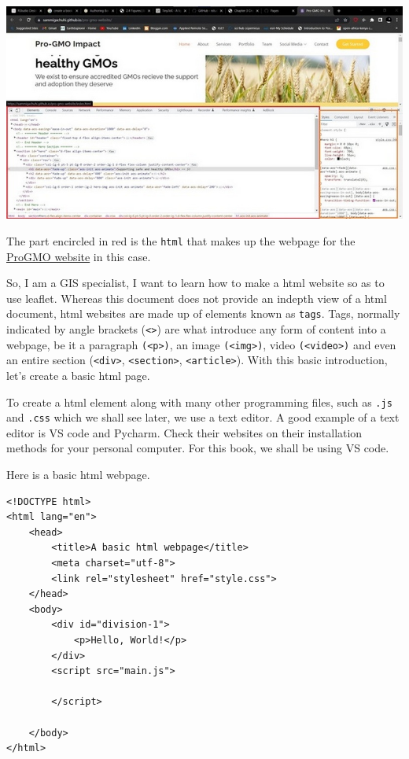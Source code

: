\documentclass[
]{book}
\theoremstyle{definition}
\theoremstyle{definition}
\theoremstyle{definition}
\theoremstyle{definition}
\theoremstyle{remark}
\begin{document}
\includegraphics[width=11.11in]{../elements}

The part encircled in red is the \texttt{html} that makes up the webpage for the \href{https://sammigachuhi.github.io/pro-gmo-website/}{ProGMO website} in this case.

So, I am a GIS specialist, I want to learn how to make a html website so as to use leaflet. Whereas this document does not provide an indepth view of a html document, html websites are made up of elements known as \texttt{tags}. Tags, normally indicated by angle brackets (\texttt{\textless{}\textgreater{}}) are what introduce any form of content into a webpage, be it a paragraph \texttt{(\textless{}p\textgreater{})}, an image \texttt{(\textless{}img\textgreater{})}, video \texttt{(\textless{}video\textgreater{})} and even an entire section (\texttt{\textless{}div\textgreater{}}, \texttt{\textless{}section\textgreater{}}, \texttt{\textless{}article\textgreater{}}). With this basic introduction, let's create a basic html page.

To create a html element along with many other programming files, such as \texttt{.js} and \texttt{.css} which we shall see later, we use a text editor. A good example of a text editor is VS code and Pycharm. Check their websites on their installation methods for your personal computer. For this book, we shall be using VS code.

Here is a basic html webpage.

\begin{verbatim}
<!DOCTYPE html>
<html lang="en">
    <head>
        <title>A basic html webpage</title>
        <meta charset="utf-8">
        <link rel="stylesheet" href="style.css">
    </head>
    <body>
        <div id="division-1">
            <p>Hello, World!</p>
        </div>
        <script src="main.js">

        </script>

    </body>
</html>
\end{verbatim}
\end{document}
